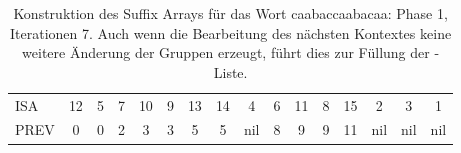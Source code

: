 \begin{table}[H]
\begin{adjustbox}{max width=\textwidth}
\begin{tabular}{lccccccccccccccc}
\multicolumn{1}{l|}{ISA}     & 12                      & 5                         & 7                       & 10                         & 9                           & 13                        & 14                         & 4                       & 6                        & 11 & 8                       & 15  & 2   & 3   & 1   \\
\multicolumn{1}{l|}{PREV}    & 0                       & \cellcolor[HTML]{\red}0 & 2                       & 3                          & 3                           & 5                         & 5                          & nil                     & 8                        & 9  & 9                       & 11  & nil & nil & nil
\end{tabular}
\end{adjustbox}

\caption[Konstruktion des Suffix Arrays f{\"u}r das Wort caabaccaabacaa: Phase 1, Iterationen 7]{Konstruktion des Suffix Arrays f{\"u}r das Wort caabaccaabacaa: Phase 1, Iterationen 7. Auch wenn die Bearbeitung des n{\"a}chsten Kontextes keine weitere {\"A}nderung der Gruppen erzeugt, f{\"u}hrt dies zur F{\"u}llung der \prevpointer-Liste.}
\label{table_complex_example_1_7} 
\end{table}

